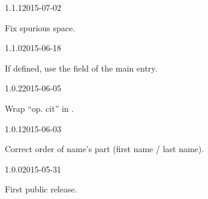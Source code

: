 \documentclass{ltxdockit}[2011/03/25]
\begin{document}
\begin{changelog}
\begin{release}{1.1.1}{2015-07-02}
\item Fix spurious space.
\end{release}

\begin{release}{1.1.0}{2015-06-18}
\item If defined, use the  field of the main entry.
\end{release}

\begin{release}{1.0.2}{2015-06-05}
\item Wrap \enquote{op. cit} in .
\end{release}

\begin{release}{1.0.1}{2015-06-03}
\item Correct order of name's part (first name / last name).
\end{release}

\begin{release}{1.0.0}{2015-05-31}
\item First public release.
\end{release}

\end{changelog}
\end{document}
